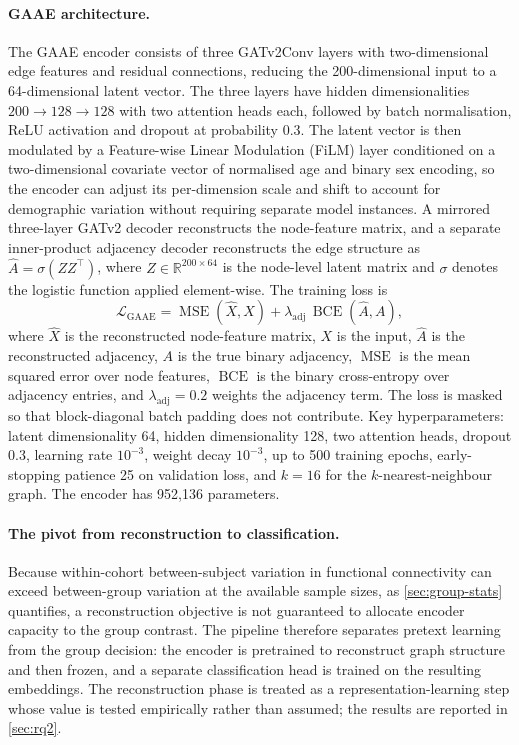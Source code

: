 \paragraph{GAAE architecture.}
The \ac{GAAE} encoder consists of three GATv2Conv layers \parencite{brody2022gatv2} with
two-dimensional edge features and residual connections, reducing the 200-dimensional input
to a 64-dimensional latent vector. The three layers have hidden dimensionalities
$200 \to 128 \to 128$ with two attention heads each, followed by batch normalisation,
ReLU activation and dropout at probability 0.3. The latent vector is then modulated by a
Feature-wise Linear Modulation (FiLM) layer conditioned on a two-dimensional covariate
vector of normalised age and binary sex encoding, so the encoder can adjust its per-dimension
scale and shift to account for demographic variation without requiring separate model
instances. A mirrored three-layer GATv2 decoder reconstructs the node-feature matrix, and a
separate inner-product adjacency decoder reconstructs the edge structure as
$\hat{A} = \sigma(ZZ^\top)$, where $Z \in \mathbb{R}^{200 \times 64}$ is the
node-level latent matrix and $\sigma$ denotes the logistic function applied element-wise.
The training loss is
\begin{equation}
  \mathcal{L}_{\text{GAAE}}
  = \operatorname{MSE}(\hat{X}, X)
  + \lambda_{\text{adj}}\,\operatorname{BCE}(\hat{A}, A),
  \label{eq:gaae-loss}
\end{equation}
where $\hat{X}$ is the reconstructed node-feature matrix, $X$ is the input, $\hat{A}$ is
the reconstructed adjacency, $A$ is the true binary adjacency, $\operatorname{MSE}$ is the
mean squared error over node features, $\operatorname{BCE}$ is the binary cross-entropy
over adjacency entries, and $\lambda_{\text{adj}} = 0.2$ weights the adjacency term. The
loss is masked so that block-diagonal batch padding does not contribute. Key
hyperparameters: latent
dimensionality 64, hidden dimensionality 128, two attention heads, dropout 0.3, learning
rate $10^{-3}$, weight decay $10^{-3}$, up to 500 training epochs, early-stopping patience
25 on validation loss, and $k = 16$ for the $k$-nearest-neighbour graph. The encoder has
952,136 parameters.

\paragraph{The pivot from reconstruction to classification.}
Because within-cohort between-subject variation in functional connectivity can exceed
between-group variation at the available sample sizes, as \autoref{sec:group-stats}
quantifies, a reconstruction objective is not guaranteed to allocate encoder capacity to
the group contrast. The pipeline therefore separates pretext learning from the group
decision: the encoder is pretrained to reconstruct graph structure and then frozen, and a
separate classification head is trained on the resulting embeddings. The reconstruction
phase is treated as a representation-learning step whose value is tested empirically rather
than assumed; the results are reported in \autoref{sec:rq2}.

